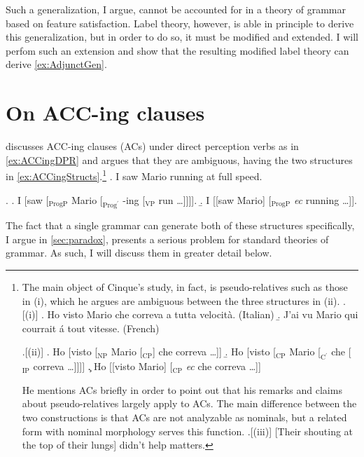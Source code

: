 \documentclass[MilwayThesis]{subfiles}
\begin{document}
Such a generalization, I argue, cannot be accounted for in a theory of grammar based on feature satisfaction.
Label theory, however, is able in principle to derive this generalization, but in order to do so, it must be modified and extended.
I will perfom such an extension and show that the resulting modified label theory can derive \cref{ex:AdjunctGen}.

\section{On ACC-ing clauses}

\textcite{cinque1996pseudo} discusses ACC-ing clauses (ACs) under direct perception verbs as in \cref{ex:ACCingDPR} and argues that they are ambiguous, having the two structures in \cref{ex:ACCingStructs}.\footnote{
	The main object of Cinque's study, in fact, is pseudo-relatives such as those in (i), which he argues are ambiguous between the three structures in (ii).
	\ex.[(i)]\label{ex:PR}
	\a. Ho visto Mario che correva a tutta velocit\`a. (Italian)
	\b. J'ai vu Mario qui courrait \'a tout vitesse. (French)

	\ex.[(ii)]\label{ex:PRStruct}
	\a. Ho [visto [$_\text{NP}$ Mario [$_\text{CP}$] che correva \ldots ]]
	\b. Ho [visto [$_\text{CP}$ Mario [$_{\text{C}^\prime}$ che [$_\text{IP}$ correva \ldots ]]]]
	\c. Ho [[visto Mario] [$_\text{CP}$ \textit{ec} che correva \ldots]]

	He mentions ACs briefly in order to point out that his remarks and claims about pseudo-relatives largely apply to ACs.
	The main difference between the two constructions is that ACs are not analyzable as nominals, but a related form with nominal morphology serves this function.
	\ex.[(iii)] [Their shouting at the top of their lungs] didn't help matters.

}
\ex. I saw Mario running at full speed. \label{ex:ACCingDPR} 

\ex.\label{ex:ACCingStructs}
\a. I [saw [$_\text{ProgP}$ Mario [$_{\text{Prog}^\prime}$ -ing [$_\text{VP}$ run \ldots]]]].
\b. I [[saw Mario] [$_\text{ProgP}$ \textit{ec} running \ldots]].

The fact that a single grammar can generate both of these structures specifically, I argue in \cref{sec:paradox},  presents a serious problem for standard theories of grammar.
As such, I will discuss them in greater detail below.
\end{document}

